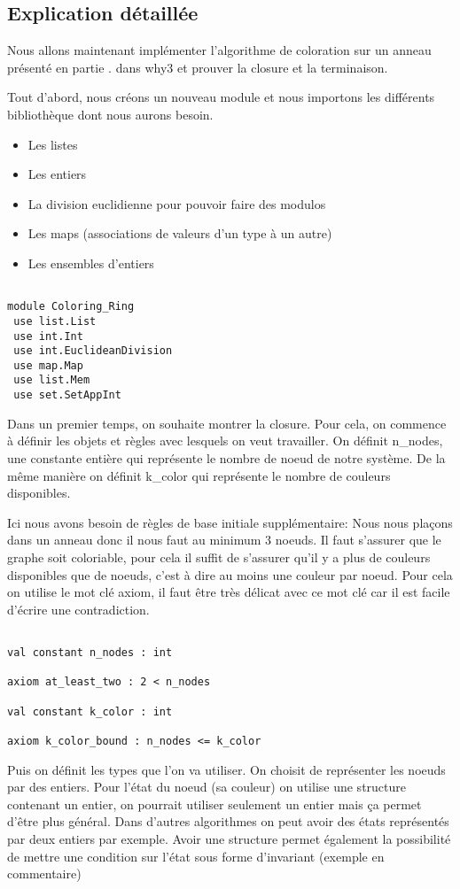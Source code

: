 \documentclass[11pt]{article}
\begin{document}
\subsection{Explication détaillée}
\label{sec:org7e949e9}


Nous allons maintenant implémenter l'algorithme de coloration sur un anneau présenté en partie . dans why3 et prouver la closure et la terminaison. 

Tout d'abord, nous créons un nouveau module et nous importons les différents bibliothèque dont nous aurons besoin. 
\begin{itemize}
\item Les listes
\item Les entiers
\item La division euclidienne pour pouvoir faire des modulos
\item Les maps (associations de valeurs d'un type à un autre)
\item Les ensembles d'entiers
\end{itemize}

\begin{verbatim}

module Coloring_Ring
 use list.List
 use int.Int
 use int.EuclideanDivision
 use map.Map
 use list.Mem
 use set.SetAppInt

\end{verbatim}

Dans un premier temps, on souhaite montrer la closure.
Pour cela, on commence à définir les objets et règles avec lesquels on veut travailler. 
On définit n\_nodes, une constante entière qui représente le nombre de noeud de notre système. 
De la même manière on définit k\_color qui représente le nombre de couleurs disponibles.

Ici nous avons besoin de règles de base initiale supplémentaire: 
Nous nous plaçons dans un anneau donc il nous faut au minimum 3 noeuds. 
Il faut s'assurer que le graphe soit coloriable, pour cela il suffit de s'assurer qu'il y a plus de couleurs disponibles que de noeuds, c'est à dire au moins une couleur par noeud. 
Pour cela on utilise le mot clé axiom, il faut être très délicat avec ce mot clé car il est facile d'écrire une contradiction. 

\begin{verbatim}

val constant n_nodes : int

axiom at_least_two : 2 < n_nodes

val constant k_color : int

axiom k_color_bound : n_nodes <= k_color

\end{verbatim}
Puis on définit les types que l'on va utiliser. 
On choisit de représenter les noeuds par des entiers.
Pour l'état du noeud (sa couleur) on utilise une structure contenant un entier, on pourrait utiliser seulement un entier mais ça permet d'être plus général.
Dans d'autres algorithmes on peut avoir des états représentés par deux entiers par exemple.
Avoir une structure permet également la possibilité de mettre une condition sur l'état sous forme d'invariant (exemple en commentaire)
\end{document}

